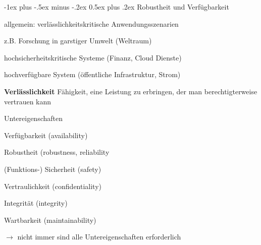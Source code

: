 \documentclass[a4paper]{article}
\makeatletter
\renewcommand{\section}{\@startsection{section}{1}{0mm}%
 {-1ex plus -.5ex minus -.2ex}%
 {0.5ex plus .2ex}%
 {\normalfont\large\bfseries}}
\makeatother
\begin{document}
\begin{multicols}{3}
    \pagebreak
    \pagebreak
    \section{Robustheit und Verfügbarkeit}
    \begin{itemize*}
        \item allgemein: verlässlichkeitskritische Anwendungsszenarien
        \item z.B. Forschung in garstiger Umwelt (Weltraum)
        \item hochsicherheitskritische Systeme (Finanz, Cloud Dienste)
        \item hochverfügbare System (öffentliche Infrastruktur, Strom)
        \item \textbf{Verlässlichkeit} Fähigkeit, eine Leistung zu erbringen, der man berechtigterweise vertrauen kann
        \item Untereigenschaften
        \begin{enumerate*}
            \item Verfügbarkeit (availability)
            \item Robustheit (robustness, reliability
            \item (Funktions-) Sicherheit (safety)
            \item Vertraulichkeit (confidentiality)
            \item Integrität (integrity)
            \item Wartbarkeit (maintainability)
        \end{enumerate*}
        \item[$\rightarrow$] nicht immer sind alle Untereigenschaften erforderlich
    \end{itemize*}


\end{multicols}
\end{document}
